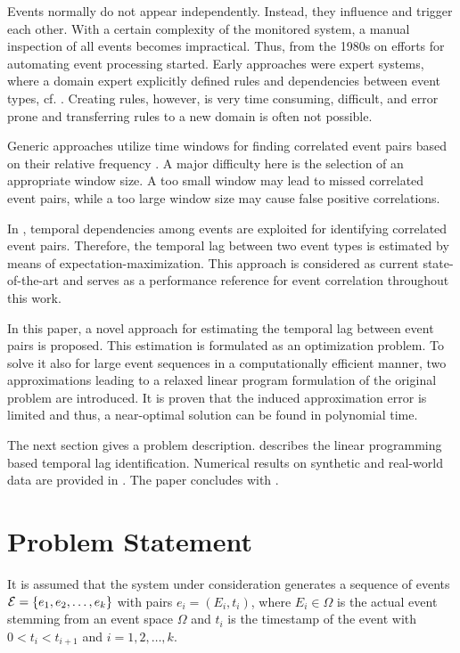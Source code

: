 \documentclass[journal, 10pt]{IEEEtran}
\begin{document}
Events normally do not appear independently. Instead, they influence and trigger each other. With a certain complexity of the monitored system, a manual inspection of all events becomes impractical. Thus, from the 1980s on efforts for automating event processing started. Early approaches were expert systems, where a domain expert explicitly defined rules and dependencies between event types, cf. \cite{Houck1995, Kettschau2002}. 
Creating rules, however, is very time consuming, difficult, and error prone and transferring rules to a new domain is often not possible.

Generic approaches utilize time windows for finding correlated event pairs based on their relative frequency \cite{Jakobson1993, Mannila1997, Bouandas2007}. A major difficulty here is the selection of an appropriate window size. A too small window may lead to missed correlated event pairs, while a too large window size may cause false positive correlations. 

In \cite{Zeng2015}, temporal dependencies among events are exploited for identifying correlated event pairs. Therefore, the temporal lag between two event types is estimated by means of expectation-maximization. This approach is considered as current state-of-the-art and serves as a performance reference for event correlation throughout this work.

In this paper, a novel approach for estimating the temporal lag between event pairs is proposed. This estimation is formulated as an optimization problem. To solve it also for large event sequences in a computationally efficient manner, two approximations leading to a relaxed linear program formulation of the original problem are introduced. It is proven that the induced approximation error is limited and thus, a near-optimal solution can be found in polynomial time. 

The next section gives a problem description.  describes the linear programming based temporal lag identification.
Numerical results on synthetic and real-world data are provided in . 
The paper concludes with .

\section{Problem Statement}
\label{sec:problem}
%
It is assumed that the system under consideration generates a sequence of events $\mathcal E = \{e_1, e_2, \ldots, e_k\}$ with pairs $e_i = (E_i, t_i)$, where $E_i \in \Omega$ is the actual event stemming from an event space $\Omega$ and $t_i$ is the timestamp of the event with $0<t_i < t_{i+1}$ and $i=1,2,\ldots,k$. %
\end{document}
